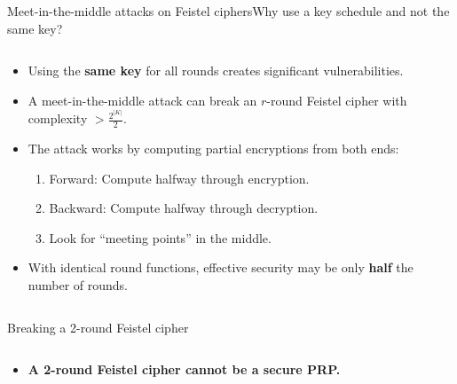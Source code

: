 \documentclass[aspectratio=169, lualatex, handout]{beamer}
\begin{document}
\begin{frame}{Meet-in-the-middle attacks on Feistel ciphers}{Why use a key schedule and not the same key?}
	\begin{columns}[c]
		\begin{column}{0.65\textwidth}
			\begin{itemize}
				\item Using the \textbf{same key} for all rounds creates significant vulnerabilities.
				\item A meet-in-the-middle attack can break an $r$-round Feistel cipher with complexity $> \frac{2^{|K|}}{2}$.
				\item The attack works by computing partial encryptions from both ends:
				      \begin{enumerate}
					      \item Forward: Compute halfway through encryption.
					      \item Backward: Compute halfway through decryption.
					      \item Look for ``meeting points'' in the middle.
				      \end{enumerate}
				\item With identical round functions, effective security may be only \textbf{half} the number of rounds.
			\end{itemize}
		\end{column}
		\begin{column}{0.35\textwidth}
			\begin{center}
			\end{center}
		\end{column}
	\end{columns}
\end{frame}

\begin{frame}{Breaking a 2-round Feistel cipher}
	\begin{columns}[c]
		\begin{column}{0.5\textwidth}
			\begin{itemize}
				\item \textbf{A 2-round Feistel cipher cannot be a secure PRP.}
			\end{itemize}
		\end{column}
		\begin{column}{0.5\textwidth}
			\begin{center}
			\end{center}
		\end{column}
	\end{columns}
\end{frame}
\end{document}
